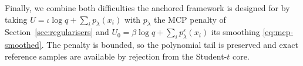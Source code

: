 Finally, we combine both difficulties the anchored framework is designed for by
taking $U=\iota\log q+\sum_i p_\lambda(x_i)$ with $p_\lambda$ the MCP penalty of
Section~\ref{sec:regularisers} and $U_0=\beta\log q+\sum_i p^\varepsilon_\lambda(x_i)$
its smoothing \eqref{eq:mcp-smoothed}.  The penalty is bounded, so the
polynomial tail is preserved and exact reference samples are available by
rejection from the Student-$t$ core.
